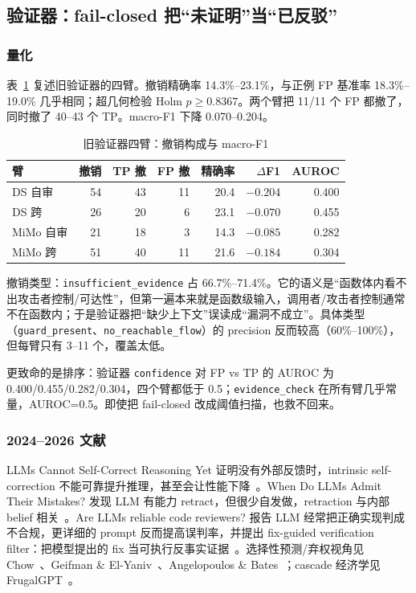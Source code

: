 \documentclass[conference]{IEEEtran}
\begin{document}
\subsection{验证器：fail-closed 把“未证明”当“已反驳”}
\label{sec:gap-verifier}

\subsubsection{量化}

表~\ref{tab:verifierbase} 复述旧验证器的四臂。撤销精确率 14.3\%--23.1\%，与正例 FP 基准率 18.3\%--19.0\% 几乎相同；超几何检验 Holm $p\ge0.8367$。两个臂把 11/11 个 FP 都撤了，同时撤了 40--43 个 TP。macro-F1 下降 0.070--0.204。

\begin{table}[t]
\centering
\caption{旧验证器四臂：撤销构成与 macro-F1}
\label{tab:verifierbase}
\footnotesize
\setlength{\tabcolsep}{2.6pt}
\begin{tabular}{@{}lrrrrrr@{}}
\toprule
臂 & 撤销 & TP 撤 & FP 撤 & 精确率 & $\Delta$F1 & AUROC \\
\midrule
DS 自审 & 54 & 43 & 11 & 20.4 & $-0.204$ & 0.400 \\
DS 跨 & 26 & 20 & 6 & 23.1 & $-0.070$ & 0.455 \\
MiMo 自审 & 21 & 18 & 3 & 14.3 & $-0.085$ & 0.282 \\
MiMo 跨 & 51 & 40 & 11 & 21.6 & $-0.184$ & 0.304 \\
\bottomrule
\end{tabular}
\end{table}

撤销类型：\texttt{insufficient\_evidence} 占 66.7\%--71.4\%。它的语义是“函数体内看不出攻击者控制/可达性”，但第一遍本来就是函数级输入，调用者/攻击者控制通常不在函数内；于是验证器把“缺少上下文”误读成“漏洞不成立”。具体类型（\texttt{guard\_present}、\texttt{no\_reachable\_flow}）的 precision 反而较高（60\%--100\%），但每臂只有 3--11 个，覆盖太低。

更致命的是排序：验证器 \texttt{confidence} 对 FP vs TP 的 AUROC 为 0.400/0.455/0.282/0.304，四个臂都低于 0.5；\texttt{evidence\_check} 在所有臂几乎常量，AUROC=0.5。即使把 fail-closed 改成阈值扫描，也救不回来。

\subsubsection{2024--2026 文献}

LLMs Cannot Self-Correct Reasoning Yet 证明没有外部反馈时，intrinsic self-correction 不能可靠提升推理，甚至会让性能下降~\cite{huang2024selfcorrect}。When Do LLMs Admit Their Mistakes? 发现 LLM 有能力 retract，但很少自发做，retraction 与内部 belief 相关~\cite{yang2025retraction}。Are LLMs reliable code reviewers? 报告 LLM 经常把正确实现判成不合规，更详细的 prompt 反而提高误判率，并提出 fix-guided verification filter：把模型提出的 fix 当可执行反事实证据~\cite{jin2026overcorrection}。选择性预测/弃权视角见 Chow~\cite{chow1970}、Geifman \& El-Yaniv~\cite{geifman2017selective}、Angelopoulos \& Bates~\cite{angelopoulos2021conformal}；cascade 经济学见 FrugalGPT~\cite{frugalgpt2023}。
\end{document}
